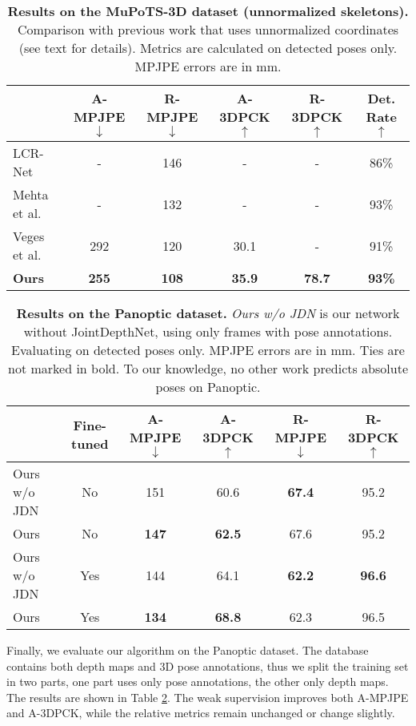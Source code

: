 \documentclass[runningheads]{llncs}
\begin{document}
\begin{table}[h]
\caption{\textbf{Results on the MuPoTS-3D dataset (unnormalized skeletons).} Comparison with previous work that uses unnormalized coordinates (see text for details). Metrics are calculated on detected poses only. MPJPE errors are in mm. }\label{tbl:mupots-normal}
\begin{center}
\begin{tabular}{lccccc}
 & A-MPJPE $\downarrow$ & R-MPJPE $\downarrow$ &  A-3DPCK $\uparrow$  & R-3DPCK $\uparrow$ & Det. Rate $\uparrow$   \\
\hline
LCR-Net \cite{rogez2017lcrnet} & - & 146  & - & - & 86\% \\
Mehta et al. \cite{mehta2018single_shot} & - & 132  & - & - & 93\% \\ 
Veges et al. \cite{veges2019depthpose} & 292 & 120  & 30.1 & - & 91\% \\
\hline
\textbf{Ours} & \textbf{255} & \textbf{108}  & \textbf{35.9} & \textbf{78.7} & \textbf{93\%} \\
\hline
\end{tabular}
\end{center}
\end{table}

\begin{table}[h]
\caption{\textbf{Results on the Panoptic dataset.} \emph{Ours w/o JDN} is our network without JointDepthNet, using only frames with pose annotations. Evaluating on detected poses only. MPJPE errors are in mm. Ties are not marked in bold. To our knowledge, no other work predicts absolute poses on Panoptic. }
\label{tbl:panoptic}
\begin{center}
\begin{tabular}{lccccc}
\hline
 & Fine-tuned & A-MPJPE $\downarrow$ & A-3DPCK $\uparrow$ & R-MPJPE $\downarrow$ & R-3DPCK $\uparrow$   \\
\hline
Ours w/o JDN & No & 151 & 60.6  & \textbf{67.4} & 95.2  \\  Ours & No & \textbf{147} & \textbf{62.5} & 67.6 & 95.2  \\ \hline
Ours w/o JDN & Yes & 144 & 64.1 & \textbf{62.2} & \textbf{96.6}  \\  Ours & Yes & \textbf{134} & \textbf{68.8}  & 62.3 & 96.5   \\ \hline
\end{tabular}
\end{center}
\end{table}

Finally, we evaluate our algorithm on the Panoptic dataset. The database contains both depth maps and 3D pose annotations, thus we split the training set in two parts, one part uses only pose annotations, the other only depth maps. The results are shown in Table \ref{tbl:panoptic}. The weak supervision improves both A\nobreakdash-MPJPE and A\nobreakdash-3DPCK, while the relative metrics remain unchanged or change slightly.
\end{document}

